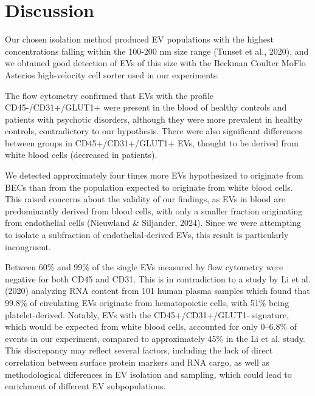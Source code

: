\documentclass[authordate, empirical]{jote-new-article}
\begin{document}
	\section{Discussion}



	Our chosen isolation method produced EV populations with the highest concentrations falling within the 100-200 nm size range (Tunset et al., 2020), and we obtained good detection of EVs of this size with the Beckman Coulter MoFlo Asterios high-velocity cell sorter used in our experiments.



	The flow cytometry confirmed that EVs with the profile CD45-/CD31+/GLUT1+ were present in the blood of healthy controls and patients with psychotic disorders, although they were more prevalent in healthy controls, contradictory to our hypothesis. There were also significant differences between groups in CD45+/CD31+/GLUT1+ EVs, thought to be derived from white blood cells (decreased in patients).



	We detected approximately four times more EVs hypothesized to originate from BECs than from the population expected to originate from white blood cells. This raised concerns about the validity of our findings, as EVs in blood are predominantly derived from blood cells, with only a smaller fraction originating from endothelial cells (Nieuwland \& Siljander, 2024). Since we were attempting to isolate a subfraction of endothelial-derived EVs, this result is particularly incongruent.



	Between 60\% and 99\% of the single EVs measured by flow cytometry were negative for both CD45 and CD31. This is in contradiction to a study by Li et al. (2020) analyzing RNA content from 101 human plasma samples which found that 99.8\% of circulating EVs originate from hematopoietic cells, with 51\% being platelet-derived. Notably, EVs with the CD45+/CD31+/GLUT1- signature, which would be expected from white blood cells, accounted for only 0--6.8\% of events in our experiment, compared to approximately 45\% in the Li et al. study. This discrepancy may reflect several factors, including the lack of direct correlation between surface protein markers and RNA cargo, as well as methodological differences in EV isolation and sampling, which could lead to enrichment of different EV subpopulations.
\end{document}
